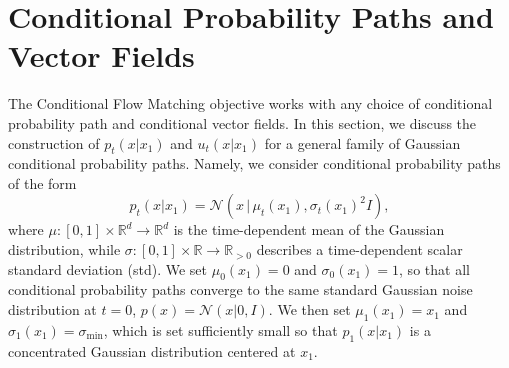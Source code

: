 \documentclass{article}
\newcommand{\yl}[1]{{\color{magenta}{\bf[Yaron:} #1{\bf]}}}
\newcommand{\Real}{\mathbb R}
\newcommand{\eps}{\varepsilon}
\newcommand{\too}{\rightarrow}
\def\eqref#1{equation~\ref{#1}}
\def\eps{{\epsilon}}
\def\gN{{\mathcal{N}}}
\begin{document}



\section{Conditional Probability Paths and Vector Fields}
\label{sec:cond_paths}

The Conditional Flow Matching objective works with any choice of conditional probability path and conditional vector fields. In this section, we discuss the construction of $p_t(x \vert x_1)$ and $u_t(x \vert x_1)$ for a general family of Gaussian conditional probability paths. 
Namely, we consider conditional probability paths of the form
\begin{equation}\label{e:pt_gau}
    p_t(x\vert x_1) = \gN(x\, \vert\, \mu_t(x_1), \sigma_t(x_1)^2 I ),
\end{equation}
where $\mu:[0,1]\times \Real^d\too \Real^d$ is the time-dependent mean of the Gaussian distribution, while $\sigma:[0,1]\times\Real\too \Real_{>0}$ describes a time-dependent scalar standard deviation (std).
%
We set $\mu_0(x_1) = 0$ and $\sigma_0(x_1) = 1$, so that all conditional probability paths converge to the same standard Gaussian noise distribution at $t=0$, $p(x)=\gN(x|0,I)$. We then set $\mu_1(x_1)=x_1$ and $\sigma_1(x_1)=\sigma_\text{min}$, which is set sufficiently small so that $p_1(x \vert x_1)$ is a concentrated Gaussian distribution centered at $x_1$.
\end{document}
